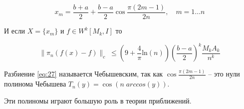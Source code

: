 \begin{equation}\label{eq:27}
x_m = \frac{b+a}{2} + \frac{b-a}{2} \cos \frac{\pi(2m-1)}{2n}, \quad m = 1...n
\end{equation}

И если $X = \{x_m\}$ и $f \in W^k[M_k, I]$ то 

\begin{equation}
\parallel \pi_n (f(x) -f) \parallel_c \; \leq \left(
9+ \frac{4}{\pi}\mathrm{ln} (n)\right) \left( \frac{b-a}{2}\right)^k \frac{M_kA_k}{n^k}
\end{equation}

Разбиение \ref{eq:27} называется Чебышевским, так как $\cos \frac{\pi(2m-1)}{2n}$  -- это нули полинома Чебышева $T_n(y) = \cos(n \; arccos(y))$.

Эти полиномы играют большую роль в теории приближений.





